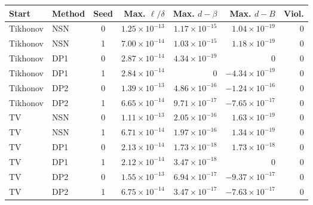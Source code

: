 \begingroup\small\setlength{\tabcolsep}{4pt}\renewcommand{\arraystretch}{1.1}
\begin{tabular}{@{}llcrrrr@{}}
\toprule
Start & Method & Seed & Max. $\ell/\delta$ & Max. $d-\beta$ & Max. $d-B$ & Viol. \\ \midrule
Tikhonov & NSN & 0 & $1.25\times10^{-13}$ & $1.17\times10^{-15}$ & $1.04\times10^{-19}$ & 0 \\
Tikhonov & NSN & 1 & $7.00\times10^{-14}$ & $1.03\times10^{-15}$ & $1.18\times10^{-19}$ & 0 \\
Tikhonov & DP1 & 0 & $2.87\times10^{-14}$ & $4.34\times10^{-19}$ & $0$ & 0 \\
Tikhonov & DP1 & 1 & $2.84\times10^{-14}$ & $0$ & $-4.34\times10^{-19}$ & 0 \\
Tikhonov & DP2 & 0 & $1.39\times10^{-13}$ & $4.86\times10^{-16}$ & $-1.24\times10^{-16}$ & 0 \\
Tikhonov & DP2 & 1 & $6.65\times10^{-14}$ & $9.71\times10^{-17}$ & $-7.65\times10^{-17}$ & 0 \\
TV & NSN & 0 & $1.11\times10^{-13}$ & $2.05\times10^{-16}$ & $1.63\times10^{-19}$ & 0 \\
TV & NSN & 1 & $6.71\times10^{-14}$ & $1.97\times10^{-16}$ & $1.34\times10^{-19}$ & 0 \\
TV & DP1 & 0 & $2.13\times10^{-14}$ & $1.73\times10^{-18}$ & $1.73\times10^{-18}$ & 0 \\
TV & DP1 & 1 & $2.12\times10^{-14}$ & $3.47\times10^{-18}$ & $0$ & 0 \\
TV & DP2 & 0 & $1.55\times10^{-13}$ & $6.94\times10^{-17}$ & $-9.37\times10^{-17}$ & 0 \\
TV & DP2 & 1 & $6.75\times10^{-14}$ & $3.47\times10^{-17}$ & $-7.63\times10^{-17}$ & 0 \\
\bottomrule
\end{tabular}\endgroup
